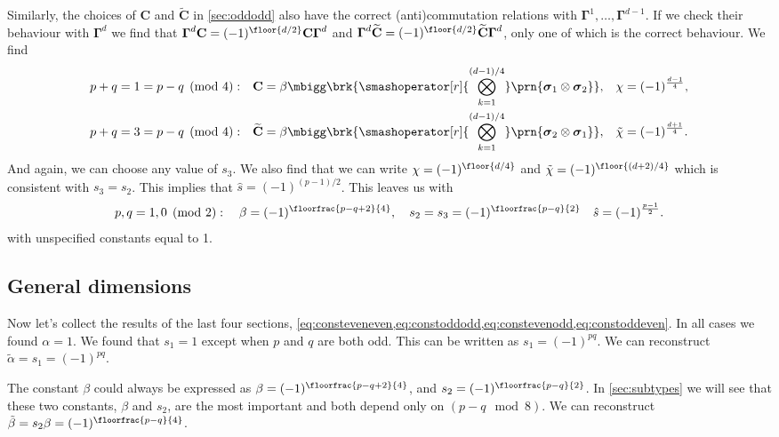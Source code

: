 \documentclass[11pt]{article}
\newcommand{\Gammab}{\boldsymbol{\Gamma}}
\renewcommand{\C}{\mathbf{C}}
\newcommand{\Ct}{\widetilde{\C}}
\newcommand{\sigmab}{\boldsymbol{\sigma}}
\newcommand{\alphat}{\tilde{\alpha}}
\newcommand{\betat}{\tilde{\beta}}
\newcommand{\chit}{\tilde{\chi}}
\begin{document}
Similarly, the choices of $\C$ and $\Ct$ in \cref{sec:oddodd} also have the correct (anti)commutation relations with $\Gammab^1, \ldots, \Gammab^{d-1}$.
If we check their behaviour with $\Gammab^d$ we find that $\Gammab^d \C = (-1)^{\floor{d/2}}\C \Gammab^d$ and $\Gammab^d \Ct = (-1)^{\floor{d/2}} \Ct \Gammab^d$, only one of which is the correct behaviour.
We find
%
\begin{equation*}
\begin{aligned}
  p+q &= 1 = p-q \pmod 4: &
  \C &= \beta
        \mbigg\brk{\smashoperator[r]{\bigotimes_{k=1}^{(d-1)/4}}
        \prn{\sigmab_1 \otimes \sigmab_2}}, &
  \chi &= (-1)^{\frac{d-1}{4}},
  \\
  p+q &= 3 = p-q \pmod 4: &
  \Ct &= \beta
        \mbigg\brk{\smashoperator[r]{\bigotimes_{k=1}^{(d-1)/4}}
        \prn{\sigmab_2 \otimes \sigmab_1}}, &
  \chit &= (-1)^{\frac{d+1}{4}}.
\end{aligned}
\end{equation*}
%
And again, we can choose any value of $s_3$.
We also find that we can write $\chi = (-1)^{\floor{d/4}}$ and $\chit = (-1)^{\floor{(d+2)/4}}$ which is consistent with \(s_3 = s_2\).
This implies that $\hat{s} = (-1)^{(p-1)/2}$.
This leaves us with
%
\begin{equation}\label{eq:constoddeven}
  p, q = 1,0 \pmod 2 : \quad
  \beta = (-1)^{\floorfrac{p-q+2}{4}}, \quad
  s_2 = s_3 = (-1)^{\floorfrac{p-q}{2}} \quad
  \hat{s} = (-1)^{\frac{p-1}{2}}.
\end{equation}
%
with unspecified constants equal to 1.



\subsection{General dimensions}\label{sec:constgendim}

Now let's collect the results of the last four sections,
\cref{eq:consteveneven,eq:constoddodd,eq:constevenodd,eq:constoddeven}.
In all cases we found $\alpha = 1$.
We found that $s_1 = 1$ except when $p$ and $q$ are both odd.
This can be written as $s_1 = (-1)^{pq}$.
We can reconstruct $\alphat = s_1 = (-1)^{pq}$.

The constant $\beta$ could always be expressed as $\beta = (-1)^{\floorfrac{p-q+2}{4}}$,
and $s_2 = (-1)^{\floorfrac{p-q}{2}}$.
In \cref{sec:subtypes} we will see that these two constants, 
$\beta$ and $s_2$, are the most important and both depend only on
\( (p - q \mod 8) \).
We can reconstruct $\betat = s_2 \beta = (-1)^{\floorfrac{p-q}{4}}$.
\end{document}
